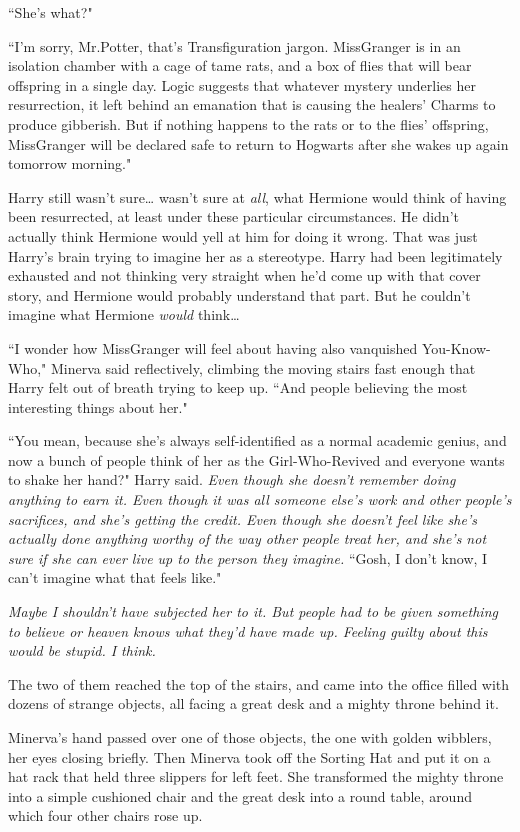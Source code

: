 ``She's what?"

``I'm sorry, Mr.\?Potter, that's Transfiguration jargon. Miss\?Granger is in an isolation chamber with a cage of tame rats, and a box of flies that will bear offspring in a single day. Logic suggests that whatever mystery underlies her resurrection, it left behind an emanation that is causing the healers' Charms to produce gibberish. But if nothing happens to the rats or to the flies' offspring, Miss\?Granger will be declared safe to return to Hogwarts after she wakes up again tomorrow morning."

Harry still wasn't sure{\ldots} wasn't sure at \emph{all}, what Hermione would think of having been resurrected, at least under these particular circumstances. He didn't actually think Hermione would yell at him for doing it wrong. That was just Harry's brain trying to imagine her as a stereotype. Harry had been legitimately exhausted and not thinking very straight when he'd come up with that cover story, and Hermione would probably understand that part. But he couldn't imagine what Hermione \emph{would} think{\ldots}

``I wonder how Miss\?Granger will feel about having also vanquished You-Know-Who," Minerva said reflectively, climbing the moving stairs fast enough that Harry felt out of breath trying to keep up. ``And people believing the most interesting things about her."

``You mean, because she's always self-identified as a normal academic genius, and now a bunch of people think of her as the Girl-Who-Revived and everyone wants to shake her hand?" Harry said. \emph{Even though she doesn't remember doing anything to earn it. Even though it was all someone else's work and other people's sacrifices, and she's getting the credit. Even though she doesn't feel like she's actually done anything worthy of the way other people treat her, and she's not sure if she can ever live up to the person they imagine.} ``Gosh, I don't know, I can't imagine what that feels like."

\emph{Maybe I shouldn't have subjected her to it. But people had to be given \emph{something} to believe or heaven knows what they'd have made up. Feeling guilty about this would be stupid. I think.}

The two of them reached the top of the stairs, and came into the office filled with dozens of strange objects, all facing a great desk and a mighty throne behind it.

Minerva's hand passed over one of those objects, the one with golden wibblers, her eyes closing briefly. Then Minerva took off the Sorting Hat and put it on a hat rack that held three slippers for left feet. She transformed the mighty throne into a simple cushioned chair and the great desk into a round table, around which four other chairs rose up.

